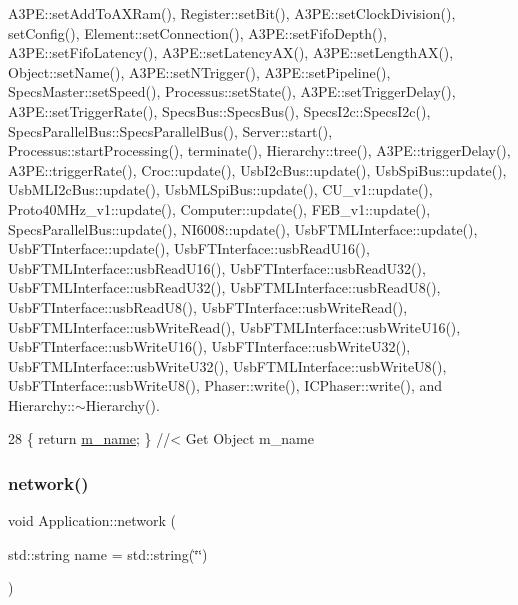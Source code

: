 A3\+P\+E\+::set\+Add\+To\+A\+X\+Ram(), Register\+::set\+Bit(), A3\+P\+E\+::set\+Clock\+Division(), set\+Config(), Element\+::set\+Connection(), A3\+P\+E\+::set\+Fifo\+Depth(), A3\+P\+E\+::set\+Fifo\+Latency(), A3\+P\+E\+::set\+Latency\+A\+X(), A3\+P\+E\+::set\+Length\+A\+X(), Object\+::set\+Name(), A3\+P\+E\+::set\+N\+Trigger(), A3\+P\+E\+::set\+Pipeline(), Specs\+Master\+::set\+Speed(), Processus\+::set\+State(), A3\+P\+E\+::set\+Trigger\+Delay(), A3\+P\+E\+::set\+Trigger\+Rate(), Specs\+Bus\+::\+Specs\+Bus(), Specs\+I2c\+::\+Specs\+I2c(), Specs\+Parallel\+Bus\+::\+Specs\+Parallel\+Bus(), Server\+::start(), Processus\+::start\+Processing(), terminate(), Hierarchy\+::tree(), A3\+P\+E\+::trigger\+Delay(), A3\+P\+E\+::trigger\+Rate(), Croc\+::update(), Usb\+I2c\+Bus\+::update(), Usb\+Spi\+Bus\+::update(), Usb\+M\+L\+I2c\+Bus\+::update(), Usb\+M\+L\+Spi\+Bus\+::update(), C\+U\+\_\+v1\+::update(), Proto40\+M\+Hz\+\_\+v1\+::update(), Computer\+::update(), F\+E\+B\+\_\+v1\+::update(), Specs\+Parallel\+Bus\+::update(), N\+I6008\+::update(), Usb\+F\+T\+M\+L\+Interface\+::update(), Usb\+F\+T\+Interface\+::update(), Usb\+F\+T\+Interface\+::usb\+Read\+U16(), Usb\+F\+T\+M\+L\+Interface\+::usb\+Read\+U16(), Usb\+F\+T\+Interface\+::usb\+Read\+U32(), Usb\+F\+T\+M\+L\+Interface\+::usb\+Read\+U32(), Usb\+F\+T\+M\+L\+Interface\+::usb\+Read\+U8(), Usb\+F\+T\+Interface\+::usb\+Read\+U8(), Usb\+F\+T\+Interface\+::usb\+Write\+Read(), Usb\+F\+T\+M\+L\+Interface\+::usb\+Write\+Read(), Usb\+F\+T\+M\+L\+Interface\+::usb\+Write\+U16(), Usb\+F\+T\+Interface\+::usb\+Write\+U16(), Usb\+F\+T\+Interface\+::usb\+Write\+U32(), Usb\+F\+T\+M\+L\+Interface\+::usb\+Write\+U32(), Usb\+F\+T\+M\+L\+Interface\+::usb\+Write\+U8(), Usb\+F\+T\+Interface\+::usb\+Write\+U8(), Phaser\+::write(), I\+C\+Phaser\+::write(), and Hierarchy\+::$\sim$\+Hierarchy().


\begin{DoxyCode}
28 \{ \textcolor{keywordflow}{return} \hyperlink{classObject_a8b83c95c705d2c3ba0d081fe1710f48d}{m\_name}; \} \textcolor{comment}{//< Get Object m\_name}
\end{DoxyCode}
\mbox{\label{classApplication_ab21cc0c86ca4e63d1fbd348d709dcddc}} 
\subsubsection{\texorpdfstring{network()}{network()}}
{\footnotesize\ttfamily void Application\+::network (\begin{DoxyParamCaption}\item[{std\+::string}]{name = {\ttfamily std\+:\+:string(\char`\"{}\char`\"{})} }\end{DoxyParamCaption})}




